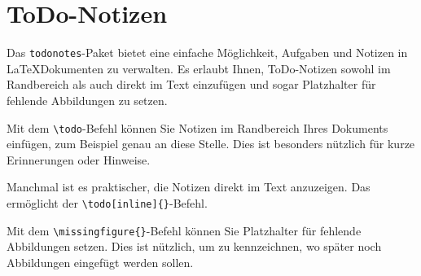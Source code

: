 \section*{ToDo-Notizen}

Das \texttt{todonotes}-Paket bietet eine einfache Möglichkeit, Aufgaben und
Notizen in \LaTeX\-Dokumenten zu verwalten. Es erlaubt Ihnen, ToDo-Notizen
sowohl im Randbereich als auch direkt im Text einzufügen und sogar Platzhalter
für fehlende Abbildungen zu setzen.

Mit dem \texttt{\textbackslash todo}-Befehl können Sie Notizen im Randbereich
Ihres Dokuments einfügen, zum Beispiel genau an diese Stelle. Dies ist besonders nützlich für kurze Erinnerungen oder
Hinweise.

Manchmal ist es praktischer, die Notizen direkt im Text anzuzeigen. Das
ermöglicht der \texttt{\textbackslash todo[inline]\{\}}-Befehl.


Mit dem \texttt{\textbackslash missingfigure\{\}}-Befehl können Sie Platzhalter
für fehlende Abbildungen setzen. Dies ist nützlich, um zu kennzeichnen, wo
später noch Abbildungen eingefügt werden sollen.

